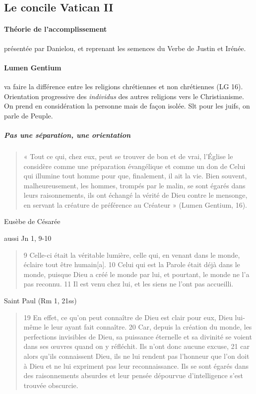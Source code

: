     \subsection{Le concile Vatican II}
    
    \paragraph{Théorie de l'accomplissement} présentée par Danielou, et reprenant les semences du Verbe de Justin et Irénée.
    
    \paragraph{Lumen Gentium} va faire la différence entre les religions chrétiennes et non chrétiennes (LG 16). Orientation progressive des \textit{individus} des autres religions vers le Christianisme. On prend en considération la personne mais de façon isolée. Slt pour les juifs, on parle de Peuple. 
    
    \subparagraph{Pas une séparation, une orientation} 
 \begin{quote}
    «  Tout  ce  qui,  chez  eux,  peut  se  trouver  de  bon  et  de  vrai,  l’Église  le  considère  comme  une  préparation évangélique  et  comme  un  don  de  Celui  qui  illumine  tout  homme  pour  que,  finalement,  il  ait  la  vie. Bien  souvent,  malheureusement,  les  hommes,  trompés  par  le  malin,  se  sont  égarés  dans  leurs raisonnements,  ils  ont  échangé  la  vérité  de  Dieu  contre  le  mensonge,  en  servant  la  créature  de préférence  au  Créateur  »  (Lumen  Gentium,  16). 
\end{quote}
 
 \begin{Def}
  Eusèbe de Césarée
 \end{Def}
 
 aussi Jn 1, 9-10
 \begin{quote}
     9 Celle-ci était la véritable lumière, celle qui, en venant dans le monde, éclaire tout être humain[a]. 10 Celui qui est la Parole était déjà dans le monde, puisque Dieu a créé le monde par lui, et pourtant, le monde ne l’a pas reconnu. 11 Il est venu chez lui, et les siens ne l’ont pas accueilli.
 \end{quote}
 
 Saint Paul (Rm 1, 21ss)
 \begin{quote}
     19 En effet, ce qu’on peut connaître de Dieu est clair pour eux, Dieu lui-même le leur ayant fait connaître. 20 Car, depuis la création du monde, les perfections invisibles de Dieu, sa puissance éternelle et sa divinité se voient dans ses œuvres quand on y réfléchit. Ils n’ont donc aucune excuse, 21 car alors qu’ils connaissent Dieu, ils ne lui rendent pas l’honneur que l’on doit à Dieu et ne lui expriment pas leur reconnaissance. Ils se sont égarés dans des raisonnements absurdes et leur pensée dépourvue d’intelligence s’est trouvée obscurcie.

 \end{quote}


